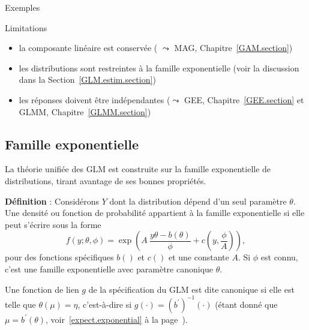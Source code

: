 \documentclass{BeamerTemplate}
\begin{document}
\begin{refsection}
\begin{frame}{Exemples}
\end{frame}

\begin{frame}{Limitations}

\begin{itemize}
\item la composante linéaire est conservée ( $\leadsto$ MAG, Chapitre~\ref{GAM.section})
\item les distributions sont restreintes à la famille exponentielle (voir la discussion dans la
Section~\ref{GLM.estim.section})
\item les réponses doivent être indépendantes ($\leadsto$ GEE, Chapitre~\ref{GEE.section}
et GLMM, Chapitre~\ref{GLMM.section})
\end{itemize}

\end{frame}

\subsection{Famille exponentielle}

\begin{frame}{}


La théorie unifiée des GLM est construite sur la {\color{blue}famille exponentielle} de
distributions, tirant avantage de ses bonnes propriétés.

\bigskip

\textbf{Définition} : Considérons $Y$ dont la distribution dépend d'un seul
paramètre $\theta$. Une densité ou fonction de probabilité appartient à
la {\color{blue}famille exponentielle} si elle peut s'écrire sous la forme
$$f(y; \theta,\phi) = \exp\left( A \ \frac{y \theta - b(\theta)}{\phi} +
c(y,\frac{\phi}{A}) \right),$$ 
pour des fonctions spécifiques $b()$ et $c()$ et une constante $A$. Si $\phi$ est
connu, c'est une famille exponentielle avec {\color{blue}paramètre canonique} $\theta$.

\bigskip
Une fonction de lien $g$ de la spécification du GLM est dite canonique si elle est
telle que $\theta(\mu)=\eta$, c'est-à-dire si $g(\cdot) = (b^{\prime})^{-1}(\cdot)$
(étant donné que $\mu=b^{\prime}(\theta)$, voir~\eqref{expect.exponential} à la
page~\pageref{expect.exponential}).   
\end{frame}


\begin{frame}{}


\end{frame}
\end{refsection}
\end{document}
